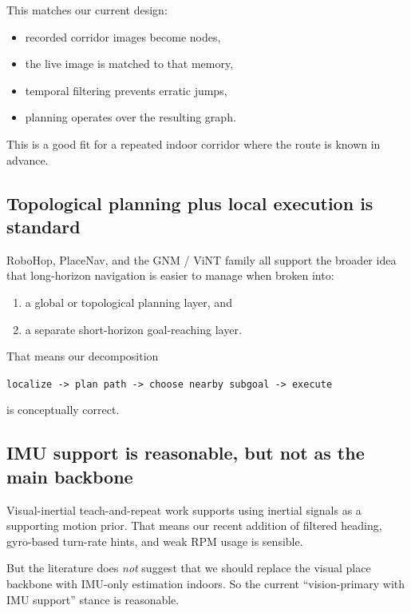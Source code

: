 \documentclass[11pt,a4paper]{article}
\begin{document}
This matches our current design:

\begin{itemize}[nosep]
  \item recorded corridor images become nodes,
  \item the live image is matched to that memory,
  \item temporal filtering prevents erratic jumps,
  \item planning operates over the resulting graph.
\end{itemize}

This is a good fit for a repeated indoor corridor where the route is known in
advance.

\subsection{Topological planning plus local execution is standard}

RoboHop, PlaceNav, and the GNM / ViNT family all support the broader idea that
long-horizon navigation is easier to manage when broken into:

\begin{enumerate}[nosep]
  \item a global or topological planning layer, and
  \item a separate short-horizon goal-reaching layer.
\end{enumerate}

That means our decomposition

\begin{center}
\texttt{localize -> plan path -> choose nearby subgoal -> execute}
\end{center}

is conceptually correct.

\subsection{IMU support is reasonable, but not as the main backbone}

Visual-inertial teach-and-repeat work supports using inertial signals as a
supporting motion prior.  That means our recent addition of filtered heading,
gyro-based turn-rate hints, and weak RPM usage is sensible.

But the literature does \emph{not} suggest that we should replace the visual
place backbone with IMU-only estimation indoors.  So the current
``vision-primary with IMU support'' stance is reasonable.
\end{document}

